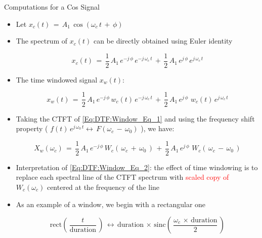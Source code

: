 \documentclass{beamer}
\begin{document}
\begin{frame}[t,allowframebreaks]{Computations for a Cos Signal}

\begin{itemize}

\item Let $x_c(t) \, = \, A_1 \, \cos(\omega_c \, t \, + \, \phi)$

\item The spectrum of $x_c(t)$ can be directly obtained using Euler identity

\begin{equation}
    x_c(t) \, = \, \displaystyle\frac{1}{2} \, A_1 \, e^{-j \, \phi} \, e^{-j \, \omega_c \, t} \, + \, \displaystyle\frac{1}{2} \, A_1 \, e^{j \, \phi} \, e^{j \, \omega_c \, t}
\end{equation}


\item The time windowed signal $x_w(t)$:

\begin{equation}
 x_w(t) \, = \, \displaystyle\frac{1}{2} \, A_1 \, e^{-j \, \phi} \, w_c(t) \, e^{-j \, \omega_c \, t} \, + \, \displaystyle\frac{1}{2} \, A_1 \, e^{j \, \phi} \, \, w_c(t) \, e^{j \, \omega_c \, t} 
 \label{Eq:DTF:Window_Eq_1}
\end{equation}

\item Taking the CTFT of \autoref{Eq:DTF:Window_Eq_1} and using the frequency shift property \cite{signal_processing_Lathi} ( $f(t) \, e^{j \, \omega_0 \, t} \leftrightarrow \, F(\omega_c \, - \, \omega_0)$ ), we have:

\begin{equation}
   X_w(\omega_c) \, = \, \displaystyle\frac{1}{2} \, A_1 \, e^{-j \, \phi} \, W_c(\, \omega_c \, + \, \omega_0 \,)  \, + \, \displaystyle\frac{1}{2} \, A_1 \, e^{j \, \phi} \, \, W_c(\, \omega_c \, - \, \omega_0 \,)
 \label{Eq:DTF:Window_Eq_2}  
\end{equation}

\item Interpretation of \autoref{Eq:DTF:Window_Eq_2}: the effect of time windowing is to replace each spectral line of the CTFT spectrum with \textcolor{red}{scaled copy of}  $W_c(\omega_c)$ centered at the frequency  of the line

\item As an example of a window, we begin with a rectangular one 

\begin{equation}
\text{rect} \left(\, \displaystyle\frac{t}{\text{duration}} \,\right) \, \leftrightarrow \, \text{duration} \, \times \, \text{sinc} \left(\,\displaystyle\frac{\omega_c \, \times \, \text{duration}}{2} \, \right)    
\end{equation}

\end{itemize}

\end{frame}
\end{document}
